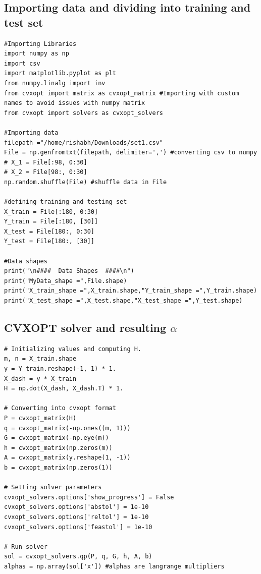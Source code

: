 \documentclass[12pt]{article}
\begin{document}
\subsection{Importing data and dividing into training and test set}
\begin{verbatim}
#Importing Libraries
import numpy as np
import csv
import matplotlib.pyplot as plt
from numpy.linalg import inv
from cvxopt import matrix as cvxopt_matrix #Importing with custom names to avoid issues with numpy matrix
from cvxopt import solvers as cvxopt_solvers

#Importing data
filepath ="/home/rishabh/Downloads/set1.csv"
File = np.genfromtxt(filepath, delimiter=',') #converting csv to numpy
# X_1 = File[:98, 0:30]
# X_2 = File[98:, 0:30]
np.random.shuffle(File) #shuffle data in File

#defining training and testing set
X_train = File[:180, 0:30]
Y_train = File[:180, [30]]
X_test = File[180:, 0:30]
Y_test = File[180:, [30]]

#Data shapes
print("\n####  Data Shapes  ####\n")
print("MyData_shape =",File.shape)
print("X_train_shape =",X_train.shape,"Y_train_shape =",Y_train.shape)
print("X_test_shape =",X_test.shape,"X_test_shape =",Y_test.shape)

\end{verbatim}
\subsection{CVXOPT solver and resulting $\alpha$}
\begin{verbatim}
# Initializing values and computing H.
m, n = X_train.shape
y = Y_train.reshape(-1, 1) * 1.
X_dash = y * X_train
H = np.dot(X_dash, X_dash.T) * 1.

# Converting into cvxopt format
P = cvxopt_matrix(H)
q = cvxopt_matrix(-np.ones((m, 1)))
G = cvxopt_matrix(-np.eye(m))
h = cvxopt_matrix(np.zeros(m))
A = cvxopt_matrix(y.reshape(1, -1))
b = cvxopt_matrix(np.zeros(1))

# Setting solver parameters 
cvxopt_solvers.options['show_progress'] = False
cvxopt_solvers.options['abstol'] = 1e-10
cvxopt_solvers.options['reltol'] = 1e-10
cvxopt_solvers.options['feastol'] = 1e-10

# Run solver
sol = cvxopt_solvers.qp(P, q, G, h, A, b)
alphas = np.array(sol['x']) #alphas are langrange multipliers
\end{verbatim}
\end{document}
